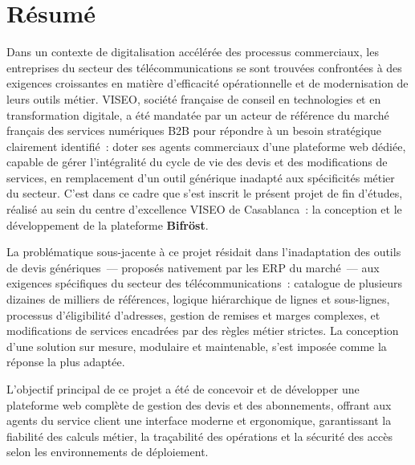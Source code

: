 
\chapter*{R\'esum\'e}
\thispagestyle{empty}

Dans un contexte de digitalisation acc\'el\'er\'ee des processus commerciaux, les entreprises du secteur des t\'el\'ecommunications se sont trouv\'ees confront\'ees \`a des exigences croissantes en mati\`ere d'efficacit\'e op\'erationnelle et de modernisation de leurs outils m\'etier. VISEO, soci\'et\'e fran\c{c}aise de conseil en technologies et en transformation digitale, a \'et\'e mandat\'ee par un acteur de r\'ef\'erence du march\'e fran\c{c}ais des services num\'eriques B2B pour r\'epondre \`a un besoin strat\'egique clairement identifi\'e~: doter ses agents commerciaux d'une plateforme web d\'edi\'ee, capable de g\'erer l'int\'egralit\'e du cycle de vie des devis et des modifications de services, en remplacement d'un outil g\'en\'erique inadapt\'e aux sp\'ecificit\'es m\'etier du secteur. C'est dans ce cadre que s'est inscrit le pr\'esent projet de fin d'\'etudes, r\'ealis\'e au sein du centre d'excellence VISEO de Casablanca~: la conception et le d\'eveloppement de la plateforme \textbf{Bifr\"ost}.

\vspace{0.2cm}

La probl\'ematique sous-jacente \`a ce projet r\'esidait dans l'inadaptation des outils de devis g\'en\'eriques~--- propos\'es nativement par les ERP du march\'e~--- aux exigences sp\'ecifiques du secteur des t\'el\'ecommunications~: catalogue de plusieurs dizaines de milliers de r\'ef\'erences, logique hi\'erarchique de lignes et sous-lignes, processus d'\'eligibilit\'e d'adresses, gestion de remises et marges complexes, et modifications de services encadr\'ees par des r\`egles m\'etier strictes. La conception d'une solution sur mesure, modulaire et maintenable, s'est impos\'ee comme la r\'eponse la plus adapt\'ee.

\vspace{0.2cm}

L'objectif principal de ce projet a \'et\'e de concevoir et de d\'evelopper une plateforme web compl\`ete de gestion des devis et des abonnements, offrant aux agents du service client une interface moderne et ergonomique, garantissant la fiabilit\'e des calculs m\'etier, la tra\c{c}abilit\'e des op\'erations et la s\'ecurit\'e des acc\`es selon les environnements de d\'eploiement.

